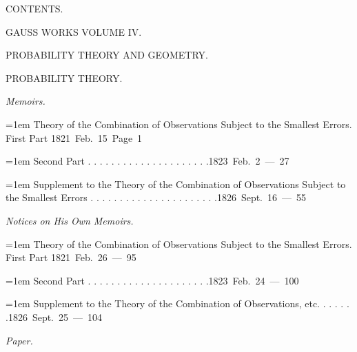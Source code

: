 \clearpage
{}%
\begin{center}\Large CONTENTS.\par\bigskip GAUSS WORKS VOLUME IV.\par\medskip\large PROBABILITY THEORY AND GEOMETRY.\end{center}
\begingroup\fontsize{10.5}{13}\selectfont{}
\par\medskip{}
\begin{center}PROBABILITY THEORY.\end{center}
\par\medskip{}
\noindent\textit{Memoirs.}\par
\par\noindent\hangindent=1em Theory of the Combination of Observations Subject to the Smallest Errors. First Part \hfill{}\hbox{}\nobreak\hfill\mbox{1821 Feb. 15 Page 1}\par
\par\noindent\hangindent=1em Second Part . . . . . . . . . . . . . . . . . . . . .\hfill{}\hbox{}\nobreak\hfill\mbox{1823 Feb. 2 — 27}\par
\par\noindent\hangindent=1em Supplement to the Theory of the Combination of Observations Subject to the Smallest Errors . . . . . . . . . . . . . . . . . . . . . .\hfill{}\hbox{}\nobreak\hfill\mbox{1826 Sept. 16 — 55}\par
\par\medskip{}
\noindent\textit{Notices on His Own Memoirs.}\par
\par\noindent\hangindent=1em Theory of the Combination of Observations Subject to the Smallest Errors. First Part \hfill{}\hbox{}\nobreak\hfill\mbox{1821 Feb. 26 — 95}\par
\par\noindent\hangindent=1em Second Part . . . . . . . . . . . . . . . . . . . . .\hfill{}\hbox{}\nobreak\hfill\mbox{1823 Feb. 24 — 100}\par
\par\noindent\hangindent=1em Supplement to the Theory of the Combination of Observations, etc. . . . . . .\hfill{}\hbox{}\nobreak\hfill\mbox{1826 Sept. 25 — 104}\par
\par\medskip{}
\noindent\textit{Paper.}\par
